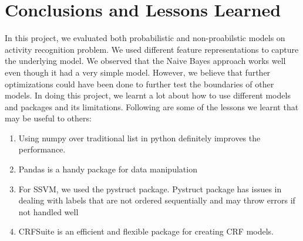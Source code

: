 \documentclass[11pt, oneside]{article}   	%
\begin{document}
\iffalse
The datasets available to us are:
	\begin{enumerate}
\item Kasteren dataset - has over a month long sensor information from 3 homes.
\item Tulum dataset - more than six month period from a single home
	\end{enumerate}
\fi

%





\section{Conclusions and Lessons Learned}
In this project, we evaluated both probabilistic and non-proabilstic models on activity recognition problem. We used different feature representations to capture the underlying model. We observed that the Naive Bayes approach works well even though it had a very simple model. However, we believe that further optimizations could have been done to further test the boundaries of other models. In doing this project, we learnt a lot about how to use different models and packages and its limitations. Following are some of the lessons we learnt that may be useful to others:
\begin{enumerate}
\item Using numpy over traditional list in python definitely improves the performance. 
\item Pandas is a handy package for data manipulation
\item For SSVM, we used the pystruct package. Pystruct package has issues in dealing with labels that are not ordered sequentially and may throw errors if not handled well
\item CRFSuite is an efficient and flexible package for creating CRF models. 
\end{enumerate}




\end{document}
